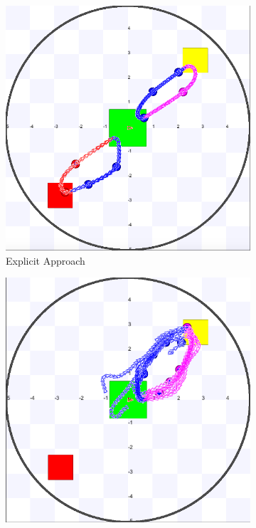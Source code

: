 \documentclass[letterpaper, 10 pt, conference]{ieeeconf}  %
\begin{document}
\begin{figure}[h]
  \begin{subfigure}{.25\textwidth}
      \includegraphics[width=0.9\linewidth]{images/explicit/2/raw/8.png}
         \centering
         \caption{Explicit Approach}
   \end{subfigure}%
     \begin{subfigure}{.25\textwidth}
       \includegraphics[width=0.9\linewidth]{images/embodied/2/raw/8.png}

\end{subfigure}
\end{figure}
\end{document}
